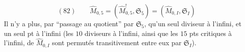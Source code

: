 \[
(82)\qquad\widehat M_{0,5}=(\widehat M^!_{0,5},\mathfrak S_5)=(\widehat M_{0,I},\mathfrak S_I)
\]
Il n'y a plus, par ``passage au quotient'' par $\mathfrak S_5$, qu'un seul diviseur à l'infini, et un seul pt  à l'infini (les $10$ diviseurs à l'infini, ainsi que les $15$ pts critiques à l'infini, de $\widehat M_{0,I}$ sont permutés transitivement entre eux par $\mathfrak S_I$).
